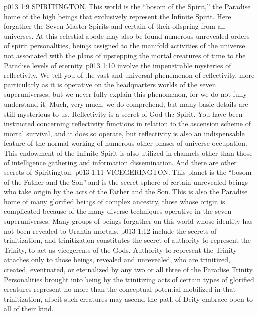 \pc \vs p013 1:9 \bibnobreakspace SPIRITINGTON. This world is the “bosom of the Spirit,” the Paradise home of the high beings that exclusively represent the Infinite Spirit. Here forgather the Seven Master Spirits and certain of their offspring from all universes. At this celestial abode may also be found numerous unrevealed orders of spirit personalities, beings assigned to the manifold activities of the universe not associated with the plans of upstepping the mortal creatures of time to the Paradise levels of eternity.
\pc \vs p013 1:10  involve the impenetrable mysteries of reflectivity. We tell you of the vast and universal phenomenon of reflectivity, more particularly as it is operative on the headquarters worlds of the seven superuniverses, but we never fully explain this phenomenon, for we do not fully understand it. Much, very much, we do comprehend, but many basic details are still mysterious to us. Reflectivity is a secret of God the Spirit. You have been instructed concerning reflectivity functions in relation to the ascension scheme of mortal survival, and it does so operate, but reflectivity is also an indispensable feature of the normal working of numerous other phases of universe occupation. This endowment of the Infinite Spirit is also utilized in channels other than those of intelligence gathering and information dissemination. And there are other secrets of Spiritington.
\pc \vs p013 1:11 \bibnobreakspace VICEGERINGTON. This planet is the “bosom of the Father and the Son” and is the secret sphere of certain unrevealed beings who take origin by the acts of the Father and the Son. This is also the Paradise home of many glorified beings of complex ancestry, those whose origin is complicated because of the many diverse techniques operative in the seven superuniverses. Many groups of beings forgather on this world whose identity has not been revealed to Urantia mortals.
\pc \vs p013 1:12  include the secrets of trinitization, and trinitization constitutes the secret of authority to represent the Trinity, to act as vicegerents of the Gods. Authority to represent the Trinity attaches only to those beings, revealed and unrevealed, who are trinitized, created, eventuated, or eternalized by any two or all three of the Paradise Trinity. Personalities brought into being by the trinitizing acts of certain types of glorified creatures represent no more than the conceptual potential mobilized in that trinitization, albeit such creatures may ascend the path of Deity embrace open to all of their kind.
